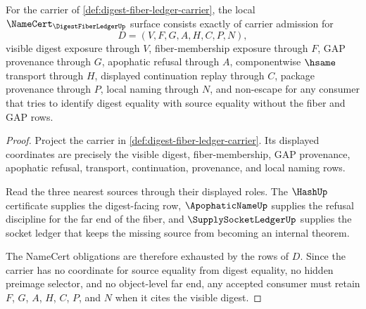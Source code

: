 \begin{theorem}
\label{thm:digest-fiber-ledger-namecert-obligations}
For the carrier of \autoref{def:digest-fiber-ledger-carrier}, the local $\NameCert_{\DigestFiberLedgerUp}$ surface consists exactly of carrier admission for
$$
D=(V,F,G,A,H,C,P,N),
$$
visible digest exposure through $V$, fiber-membership exposure through $F$, GAP provenance through $G$, apophatic refusal through $A$, componentwise $\hsame$ transport through $H$, displayed continuation replay through $C$, package provenance through $P$, local naming through $N$, and non-escape for any consumer that tries to identify digest equality with source equality without the fiber and GAP rows.
\end{theorem}
\begin{proof}
Project the carrier in \autoref{def:digest-fiber-ledger-carrier}. Its displayed coordinates are precisely the visible digest, fiber-membership, GAP provenance, apophatic refusal, transport, continuation, provenance, and local naming rows.

Read the three nearest sources through their displayed roles. The $\HashUp$ certificate supplies the digest-facing row, $\ApophaticNameUp$ supplies the refusal discipline for the far end of the fiber, and $\SupplySocketLedgerUp$ supplies the socket ledger that keeps the missing source from becoming an internal theorem.

The NameCert obligations are therefore exhausted by the rows of $D$. Since the carrier has no coordinate for source equality from digest equality, no hidden preimage selector, and no object-level far end, any accepted consumer must retain $F$, $G$, $A$, $H$, $C$, $P$, and $N$ when it cites the visible digest.
\end{proof}

